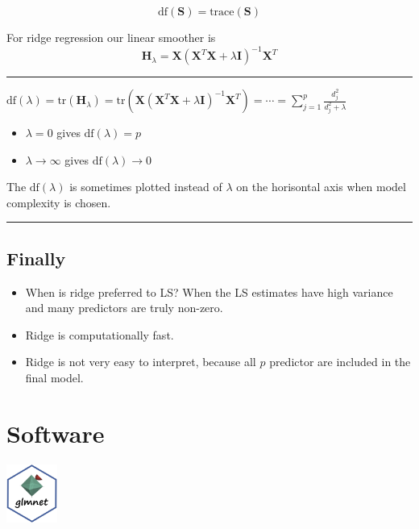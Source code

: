 \documentclass[
  letterpaper,
  DIV=11,
  numbers=noendperiod]{scrartcl}
\providecommand{\tightlist}{%
  \setlength{\itemsep}{0pt}\setlength{\parskip}{0pt}}\usepackage{longtable,booktabs,array}
\begin{document}
\[\text{df}({\mathbf S})=\text{trace}({\mathbf S})\]

For ridge regression our linear smoother is
\[{\mathbf H}_{\lambda}={\mathbf X}({\mathbf X}^T{\mathbf X}+ \lambda {\mathbf I})^{-1}{\mathbf X}^T\]

\begin{center}\rule{0.5\linewidth}{0.5pt}\end{center}

\(\text{df}(\lambda)=\text{tr}({\mathbf H}_{\lambda})=\text{tr}({\mathbf X}({\mathbf X}^T{\mathbf X}+ \lambda {\mathbf I})^{-1}{\mathbf X}^T)=\cdots=\sum_{j=1}^p \frac{d_j^2}{d_j^2+\lambda}\)

\begin{itemize}
\tightlist
\item
  \(\lambda=0\) gives \(\text{df}(\lambda)=p\)
\item
  \(\lambda \rightarrow \infty\) gives
  \(\text{df}(\lambda)\rightarrow 0\)
\end{itemize}

The \(\text{df}(\lambda)\) is sometimes plotted instead of \(\lambda\)
on the horisontal axis when model complexity is chosen.

\begin{center}\rule{0.5\linewidth}{0.5pt}\end{center}

\hypertarget{finally}{%
\subsection{Finally}\label{finally}}

\begin{itemize}
\tightlist
\item
  When is ridge preferred to LS? When the LS estimates have high
  variance and many predictors are truly non-zero.
\item
  Ridge is computationally fast.
\item
  Ridge is not very easy to interpret, because all \(p\) predictor are
  included in the final model.
\end{itemize}

\hypertarget{software}{%
\section{Software}\label{software}}

\includegraphics[width=0.66in,height=\textheight]{logo.png}
\end{document}
